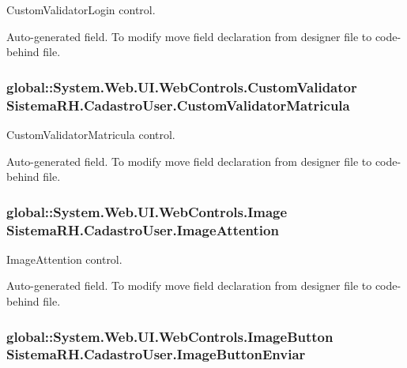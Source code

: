 CustomValidatorLogin control. 

Auto-\/generated field. To modify move field declaration from designer file to code-\/behind file. \hypertarget{class_sistema_r_h_1_1_cadastro_user_a851aa0b26928f5d46156761af83bc076}{
\subsubsection[{CustomValidatorMatricula}]{\setlength{\rightskip}{0pt plus 5cm}global::System.Web.UI.WebControls.CustomValidator {\bf SistemaRH.CadastroUser.CustomValidatorMatricula}}}
\label{class_sistema_r_h_1_1_cadastro_user_a851aa0b26928f5d46156761af83bc076}


CustomValidatorMatricula control. 

Auto-\/generated field. To modify move field declaration from designer file to code-\/behind file. \hypertarget{class_sistema_r_h_1_1_cadastro_user_ac26a207db24e271bfd6d2a88a0e30148}{
\subsubsection[{ImageAttention}]{\setlength{\rightskip}{0pt plus 5cm}global::System.Web.UI.WebControls.Image {\bf SistemaRH.CadastroUser.ImageAttention}}}
\label{class_sistema_r_h_1_1_cadastro_user_ac26a207db24e271bfd6d2a88a0e30148}


ImageAttention control. 

Auto-\/generated field. To modify move field declaration from designer file to code-\/behind file. \hypertarget{class_sistema_r_h_1_1_cadastro_user_a16ac9fdb9bf9fff0937b6ebd68d5700d}{
\subsubsection[{ImageButtonEnviar}]{\setlength{\rightskip}{0pt plus 5cm}global::System.Web.UI.WebControls.ImageButton {\bf SistemaRH.CadastroUser.ImageButtonEnviar}}}
\label{class_sistema_r_h_1_1_cadastro_user_a16ac9fdb9bf9fff0937b6ebd68d5700d}


